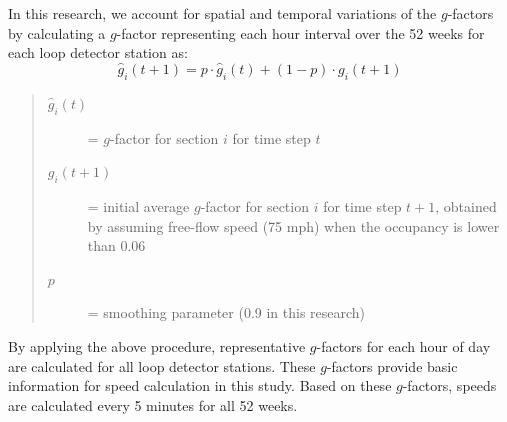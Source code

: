 \documentclass[12pt]{report}
\begin{document}
In this research, we account for spatial and temporal variations of the
$g$-factors by calculating a $g$-factor representing each hour interval over the
52 weeks for each loop detector station as:
\begin{equation}
  \label{eq:g-fact}
  \hat{g}_i(t+1) = p\cdot{}\hat{g}_i(t)+(1-p)\cdot{}g_i(t+1)
\end{equation}
\begin{quote}
  \begin{description}
  \item[$\hat{g}_i(t)$] = $g$-factor for section $i$ for time step $t$
  \item[$g_i(t+1)$] = initial average $g$-factor for section $i$ for
    time step $t+1$, obtained by assuming free-flow speed (75 mph)
    when the occupancy is lower than 0.06
  \item[$p$] = smoothing parameter (0.9 in this research)
  \end{description}
\end{quote}
By applying the above procedure, representative $g$-factors for each hour of day
are calculated for all loop detector stations. These $g$-factors provide basic
information for speed calculation in this study. Based on these $g$-factors,
speeds are calculated every 5 minutes for all 52 weeks.
\end{document}
